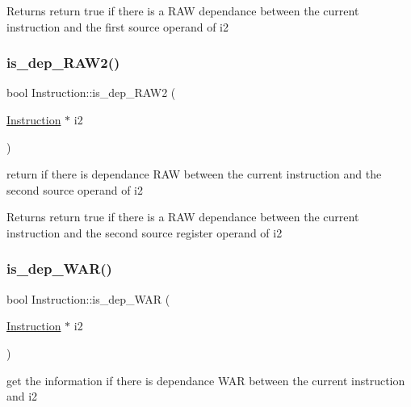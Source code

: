 \begin{DoxyReturn}{Returns}
return true if there is a R\+AW dependance between the current instruction and the first source operand of i2 
\end{DoxyReturn}
\mbox{\label{class_instruction_aa28ae5f427ee02c96466f1ac68060f87}} 
\subsubsection{\texorpdfstring{is\+\_\+dep\+\_\+\+R\+A\+W2()}{is\_dep\_RAW2()}}
{\footnotesize\ttfamily bool Instruction\+::is\+\_\+dep\+\_\+\+R\+A\+W2 (\begin{DoxyParamCaption}\item[{\mbox{\hyperlink{class_instruction}{Instruction}} $\ast$}]{i2 }\end{DoxyParamCaption})}



return if there is dependance R\+AW between the current instruction and the second source operand of i2 ~\newline
 

\begin{DoxyReturn}{Returns}
return true if there is a R\+AW dependance between the current instruction and the second source register operand of i2 
\end{DoxyReturn}
\mbox{\label{class_instruction_ae79b239c6ab30a15064b5a00944ad65a}} 
\subsubsection{\texorpdfstring{is\+\_\+dep\+\_\+\+W\+A\+R()}{is\_dep\_WAR()}}
{\footnotesize\ttfamily bool Instruction\+::is\+\_\+dep\+\_\+\+W\+AR (\begin{DoxyParamCaption}\item[{\mbox{\hyperlink{class_instruction}{Instruction}} $\ast$}]{i2 }\end{DoxyParamCaption})}



get the information if there is dependance W\+AR between the current instruction and i2 ~\newline
 

